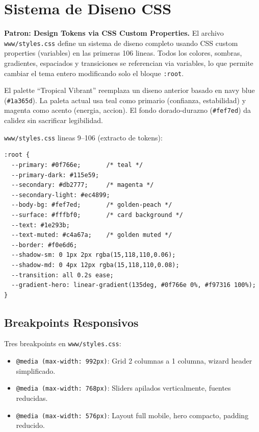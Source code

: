 \documentclass[11pt, letterpaper, twoside]{report}
\begin{document}
\section{Sistema de Diseno CSS}
\label{sec:css}

\begin{patronbox}
\textbf{Patron: Design Tokens via CSS Custom Properties.} El archivo
\texttt{www/styles.css} define un sistema de diseno completo usando CSS custom
properties (variables) en las primeras 106 lineas. Todos los colores, sombras,
gradientes, espaciados y transiciones se referencian via variables, lo que permite
cambiar el tema entero modificando solo el bloque \texttt{:root}.
\end{patronbox}

\begin{intuicionbox}
El palette ``Tropical Vibrant'' reemplaza un diseno anterior basado en navy blue
(\texttt{\#1a365d}). La paleta actual usa teal como primario (confianza, estabilidad)
y magenta como acento (energia, accion). El fondo dorado-durazno (\texttt{\#fef7ed})
da calidez sin sacrificar legibilidad.
\end{intuicionbox}

\begin{codigobox}
\texttt{www/styles.css} lineas 9--106 (extracto de tokens):
\begin{lstlisting}[language={}, caption={Design tokens CSS}]
:root {
  --primary: #0f766e;       /* teal */
  --primary-dark: #115e59;
  --secondary: #db2777;     /* magenta */
  --secondary-light: #ec4899;
  --body-bg: #fef7ed;       /* golden-peach */
  --surface: #fffbf0;       /* card background */
  --text: #1e293b;
  --text-muted: #c4a67a;    /* golden muted */
  --border: #f0e6d6;
  --shadow-sm: 0 1px 2px rgba(15,118,110,0.06);
  --shadow-md: 0 4px 12px rgba(15,118,110,0.08);
  --transition: all 0.2s ease;
  --gradient-hero: linear-gradient(135deg, #0f766e 0%, #f97316 100%);
}
\end{lstlisting}
\end{codigobox}

\subsection{Breakpoints Responsivos}

\begin{codigobox}
Tres breakpoints en \texttt{www/styles.css}:
\begin{itemize}[nosep]
\item \texttt{@media (max-width: 992px)}: Grid 2 columnas a 1 columna,
      wizard header simplificado.
\item \texttt{@media (max-width: 768px)}: Sliders apilados verticalmente,
      fuentes reducidas.
\item \texttt{@media (max-width: 576px)}: Layout full mobile, hero compacto,
      padding reducido.
\end{itemize}
\end{codigobox}
\end{document}
